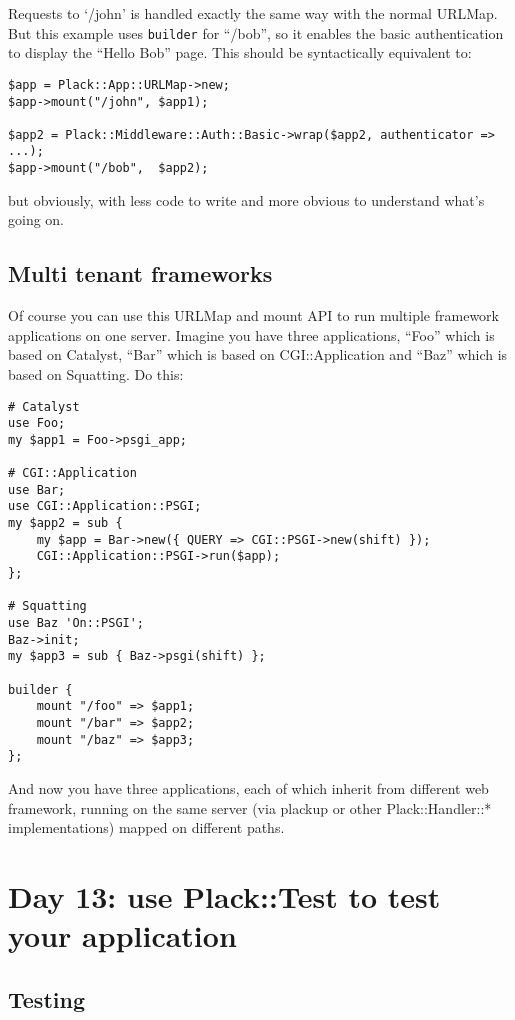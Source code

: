 Requests to `/john' is handled exactly the same way with the normal
URLMap. But this example uses \lstinline!builder! for ``/bob'', so it
enables the basic authentication to display the ``Hello Bob'' page. This
should be syntactically equivalent to:

\begin{lstlisting}
$app = Plack::App::URLMap->new;
$app->mount("/john", $app1);

$app2 = Plack::Middleware::Auth::Basic->wrap($app2, authenticator => ...);
$app->mount("/bob",  $app2);
\end{lstlisting}

but obviously, with less code to write and more obvious to understand
what's going on.

\section{Multi tenant frameworks}\label{multi-tenant-frameworks}

Of course you can use this URLMap and mount API to run multiple
framework applications on one server. Imagine you have three
applications, ``Foo'' which is based on Catalyst, ``Bar'' which is based
on CGI::Application and ``Baz'' which is based on Squatting. Do this:

\begin{lstlisting}
# Catalyst
use Foo;
my $app1 = Foo->psgi_app;

# CGI::Application
use Bar;
use CGI::Application::PSGI;
my $app2 = sub { 
    my $app = Bar->new({ QUERY => CGI::PSGI->new(shift) });
    CGI::Application::PSGI->run($app);
};

# Squatting
use Baz 'On::PSGI';
Baz->init;
my $app3 = sub { Baz->psgi(shift) };

builder {
    mount "/foo" => $app1;
    mount "/bar" => $app2;
    mount "/baz" => $app3;
};
\end{lstlisting}

And now you have three applications, each of which inherit from
different web framework, running on the same server (via plackup or
other Plack::Handler::* implementations) mapped on different paths.

\chapter{Day 13: use Plack::Test to test your
application}\label{day-13-use-placktest-to-test-your-application}

\section{Testing}\label{testing}

